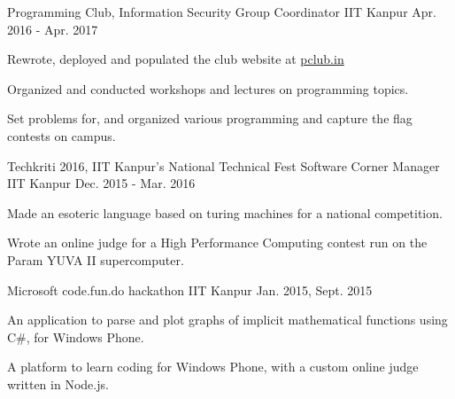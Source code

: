 \vspace{-0.3cm}


\begin{cventries}

  \extraentry
  {Programming Club, Information Security Group}
  {Coordinator}
  {IIT Kanpur}
  {Apr. 2016 - Apr. 2017}
  {
    \begin{cvitems}
    \item Rewrote, deployed and populated the club website at \href{http://pclub.in}{pclub.in}
    \item Organized and conducted workshops and lectures on programming topics.
    \item Set problems for, and organized various programming and capture the flag
      contests on campus.
    \end{cvitems}
  }

  \extraentry
  {Techkriti 2016, IIT Kanpur's National Technical Fest}
  {Software Corner Manager}
  {IIT Kanpur}
  {Dec. 2015 - Mar. 2016}
  {
    \begin{cvitems}
    \item Made an esoteric language based on turing machines for a
      national competition.
    \item Wrote an online judge for a High Performance Computing
      contest run on the Param YUVA II supercomputer.
    \end{cvitems}
  }

  {Microsoft code.fun.do hackathon}
  {IIT Kanpur}
  {Jan. 2015, Sept. 2015}
  {
    \begin{cvitems}
    \item An application to parse and plot graphs of implicit
      mathematical functions using C\#, for Windows Phone.
    \item A platform to learn coding for Windows Phone, with a
      custom online judge written in Node.js.
    \end{cvitems}
  }

\end{cventries}

